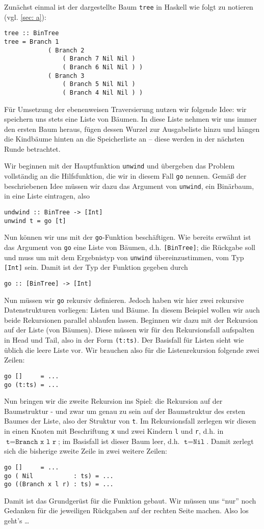 \documentclass[ngerman, a4paper, 11pt]{article}
\theoremstyle{nonumberplain}
\begin{document}
Zunächst einmal ist der dargestellte Baum \texttt{tree} in Haskell wie folgt zu notieren (vgl. \cref{sec: a}):
\begin{lstlisting}[style=noframe]
tree :: BinTree
tree = Branch 1
			( Branch 2
				( Branch 7 Nil Nil ) 
				( Branch 6 Nil Nil ) )
			( Branch 3
				( Branch 5 Nil Nil )
				( Branch 4 Nil Nil ) )
\end{lstlisting}

Für Umsetzung der ebenenweisen Traversierung nutzen wir folgende Idee: wir speichern uns stets eine Liste von Bäumen. In diese Liste nehmen wir uns immer den ersten Baum heraus, fügen dessen Wurzel zur Ausgabeliste hinzu und hängen die Kindbäume hinten an die Speicherliste an -- diese werden in der nächsten Runde betrachtet. 

Wir beginnen mit der Hauptfunktion \texttt{unwind} und übergeben das Problem vollständig an die Hilfsfunktion, die wir in diesem Fall \texttt{go} nennen. Gemäß der beschriebenen Idee müssen wir dazu das Argument von \texttt{unwind}, ein Binärbaum, in eine Liste eintragen, also
\begin{lstlisting}[style=noframe]
undwind :: BinTree -> [Int]
unwind t = go [t]
\end{lstlisting} 

Nun können wir uns mit der \texttt{go}-Funktion beschäftigen. Wie bereits erwähnt ist das Argument von \texttt{go} eine Liste von Bäumen, d.h. \texttt{[BinTree]}; die Rückgabe soll und muss um mit dem Ergebnistyp von \texttt{unwind} übereinzustimmen, vom Typ \texttt{[Int]} sein. Damit ist der Typ der Funktion gegeben durch
\begin{lstlisting}[style=noframe]
go :: [BinTree] -> [Int]
\end{lstlisting}
Nun müssen wir \texttt{go} rekursiv definieren. Jedoch haben wir hier zwei rekursive Datenstrukturen vorliegen: Listen und Bäume. In diesem Beispiel wollen wir auch beide Rekursionen parallel ablaufen lassen.
Beginnen wir dazu mit der Rekursion auf der Liste (von Bäumen). Diese müssen wir für den Rekursionsfall aufspalten in Head und Tail, also in der Form \texttt{(t:ts)}. Der Basisfall für Listen sieht wie üblich die leere Liste vor. Wir brauchen also für die Listenrekursion folgende zwei Zeilen:
\begin{lstlisting}[style=noframe]
go []     = ...
go (t:ts) = ...
\end{lstlisting}
Nun bringen wir die zweite Rekursion ins Spiel: die Rekursion auf der Baumstruktur - und zwar um genau zu sein auf der Baumstruktur des ersten Baumes der Liste, also der Struktur von \texttt{t}. Im Rekursionsfall zerlegen wir diesen in einen Knoten mit Beschriftung \texttt{x} und zwei Kindern \texttt{l} und \texttt{r}, d.h. in $\texttt{t} = \texttt{Branch x l r}$; im Basisfall ist dieser Baum leer, d.h. $\texttt{t} = \texttt{Nil}$. Damit zerlegt sich die bisherige zweite Zeile in zwei weitere Zeilen:
\begin{lstlisting}[style=noframe]
go []     = ...
go ( Nil           : ts) = ...
go ((Branch x l r) : ts) = ...
\end{lstlisting}
Damit ist das Grundgerüst für die Funktion gebaut. Wir müssen uns \enquote{nur} noch Gedanken für die jeweiligen Rückgaben auf der rechten Seite machen. Also los geht's \dots
\end{document}
